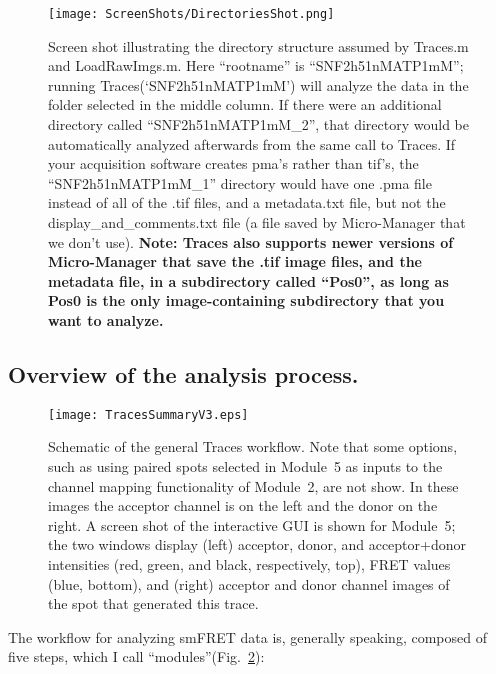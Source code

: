 \documentclass[11pt]{article}
\begin{document}
\begin{figure}[!t]
\begin{center}
\texttt{[image: ScreenShots/DirectoriesShot.png]}
\caption{Screen shot illustrating the directory structure assumed by Traces.m and LoadRawImgs.m.  Here ``rootname'' is ``SNF2h51nMATP1mM''; running Traces(`SNF2h51nMATP1mM') will analyze the data in the folder selected in the middle column. If there were an additional directory called ``SNF2h51nMATP1mM\_2'', that directory would be automatically analyzed afterwards from the same call to Traces.  If your acquisition software creates pma's rather than tif's, the ``SNF2h51nMATP1mM\_1'' directory would have one .pma file instead of all of the .tif files, and a metadata.txt file, but not the display\_and\_comments.txt file (a file saved by Micro-Manager that we don't use).  {\bf Note: Traces also supports newer versions of Micro-Manager that save the .tif image files, and the metadata file, in a subdirectory called ``Pos0'', as long as Pos0 is the only image-containing subdirectory that you want to analyze.}}
\label{fig:DirectoryStructure}
\end{center}
\end{figure}

\subsection{Overview of the analysis process.}

\begin{figure}[!t]
\begin{center}
\texttt{[image: TracesSummaryV3.eps]}
\caption{Schematic of the general Traces workflow. Note that some options, such as using paired spots selected in Module~5 as inputs to the channel mapping functionality of Module~2, are not show. In these images the acceptor channel is on the left and the donor on the right. A screen shot of the interactive GUI is shown for Module~5; the two windows display (left) acceptor, donor, and acceptor+donor intensities (red, green, and black, respectively, top), FRET values (blue, bottom), and (right) acceptor and donor channel images of the spot that generated this trace.}
\label{fig:Workflow}
\end{center}
\end{figure}

The workflow for analyzing smFRET data is, generally speaking, composed of five steps, which I call ``modules''(Fig.~\ref{fig:Workflow}): \\
\end{document}
